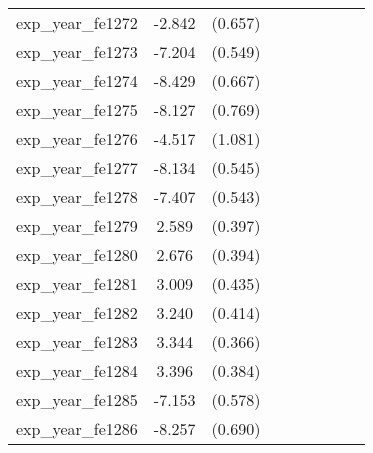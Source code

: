 {\begin{tabular}{l*{4}{cc}}
exp\_year\_fe1272&   -2.842\sym{***}&  (0.657)&                  &         &                  &         &                  &         \\
exp\_year\_fe1273&   -7.204\sym{***}&  (0.549)&                  &         &                  &         &                  &         \\
exp\_year\_fe1274&   -8.429\sym{***}&  (0.667)&                  &         &                  &         &                  &         \\
exp\_year\_fe1275&   -8.127\sym{***}&  (0.769)&                  &         &                  &         &                  &         \\
exp\_year\_fe1276&   -4.517\sym{***}&  (1.081)&                  &         &                  &         &                  &         \\
exp\_year\_fe1277&   -8.134\sym{***}&  (0.545)&                  &         &                  &         &                  &         \\
exp\_year\_fe1278&   -7.407\sym{***}&  (0.543)&                  &         &                  &         &                  &         \\
exp\_year\_fe1279&    2.589\sym{***}&  (0.397)&                  &         &                  &         &                  &         \\
exp\_year\_fe1280&    2.676\sym{***}&  (0.394)&                  &         &                  &         &                  &         \\
exp\_year\_fe1281&    3.009\sym{***}&  (0.435)&                  &         &                  &         &                  &         \\
exp\_year\_fe1282&    3.240\sym{***}&  (0.414)&                  &         &                  &         &                  &         \\
exp\_year\_fe1283&    3.344\sym{***}&  (0.366)&                  &         &                  &         &                  &         \\
exp\_year\_fe1284&    3.396\sym{***}&  (0.384)&                  &         &                  &         &                  &         \\
exp\_year\_fe1285&   -7.153\sym{***}&  (0.578)&                  &         &                  &         &                  &         \\
exp\_year\_fe1286&   -8.257\sym{***}&  (0.690)&                  &         &                  &         &                  &         \\

\end{tabular}}

